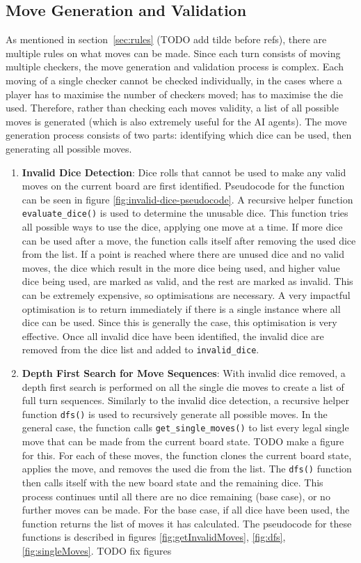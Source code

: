 \subsection{Move Generation and Validation}
As mentioned in section~\ref{sec:rules} (TODO add tilde before refs), there are multiple rules on what moves can be made. Since each turn consists of moving multiple checkers, the move generation and validation process is complex. Each moving of a single checker cannot be checked individually, in the cases where a player has to maximise the number of checkers moved; has to maximise the die used. Therefore, rather than checking each moves validity, a list of all possible moves is generated (which is also extremely useful for the AI agents).
The move generation process consists of two parts: identifying which dice can be used, then generating all possible moves.
\begin{enumerate}
    \item \textbf{Invalid Dice Detection}: Dice rolls that cannot be used to make any valid moves on the current board are first identified. Pseudocode for the function can be seen in figure \ref{fig:invalid-dice-pseudocode}. A recursive helper function \texttt{evaluate\_dice()} is used to determine the unusable dice. This function tries all possible ways to use the dice, applying one move at a time. If more dice can be used after a move, the function calls itself after removing the used dice from the list. If a point is reached where there are unused dice and no valid moves, the dice which result in the more dice being used, and higher value dice being used, are marked as valid, and the rest are marked as invalid. This can be extremely expensive, so optimisations are necessary. A very impactful optimisation is to return immediately if there is a single instance where all dice can be used. Since this is generally the case, this optimisation is very effective. 
    Once all invalid dice have been identified, the invalid dice are removed from the dice list and added to \texttt{invalid\_dice}.

    \item \textbf{Depth First Search for Move Sequences}: With invalid dice removed, a depth first search is performed on all the single die moves to create a list of full turn sequences. Similarly to the invalid dice detection, a recursive helper function \texttt{dfs()} is used to recursively generate all possible moves. In the general case, the function calls \texttt{get\_single\_moves()} to list every legal single move that can be made from the current board state. TODO make a figure for this. For each of these moves, the function clones the current board state, applies the move, and removes the used die from the list. The \texttt{dfs()} function then calls itself with the new board state and the remaining dice. This process continues until all there are no dice remaining (base case), or no further moves can be made. For the base case, if all dice have been used, the function returns the list of moves it has calculated. The pseudocode for these functions is described in figures \ref{fig:getInvalidMoves}, \ref{fig:dfs}, \ref{fig:singleMoves}. TODO fix figures
\end{enumerate}

